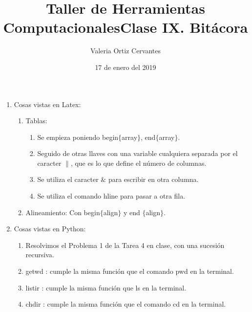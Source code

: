 \documentclass{article}
\title{\Huge Taller de Herramientas Computacionales}
\author{Valeria Ortiz Cervantes}
\date{17 de enero del 2019}
\begin{document}
	\maketitle
	\newpage
	\title{Clase IX. Bitácora\\}
	\begin{enumerate}
		\item Cosas vistas en Latex:
		\begin{enumerate}
			\item Tablas:
			\begin{enumerate}
				\item Se empieza poniendo begin$\{$array$\}$, end$\{$array$\}$.
				\item Seguido de otras llaves con una variable cualquiera separada por el caracter $\|$, que es lo que define el número de columnas.
				\item Se utiliza el caracter $\&$ para escribir en otra columna. 
				\item Se utiliza el comando hline para pasar a otra fila.
			\end{enumerate}
			\item Alineamiento: Con begin$\{$align$\}$ y end $\{$align$\}$.
		\end{enumerate}
		\item Cosas vistas en Python:
		\begin{enumerate}
			\item Resolvimos el Problema 1 de la Tarea 4 en clase, con una sucesión recursiva.
			\item getwd : cumple la misma función que el comando pwd en la terminal. 
			\item listir : cumple la misma función que ls en la terminal. 
			\item chdir : cumple la misma función que el comando cd en la terminal. 
		\end{enumerate}
	\end{enumerate}
\end{document}
